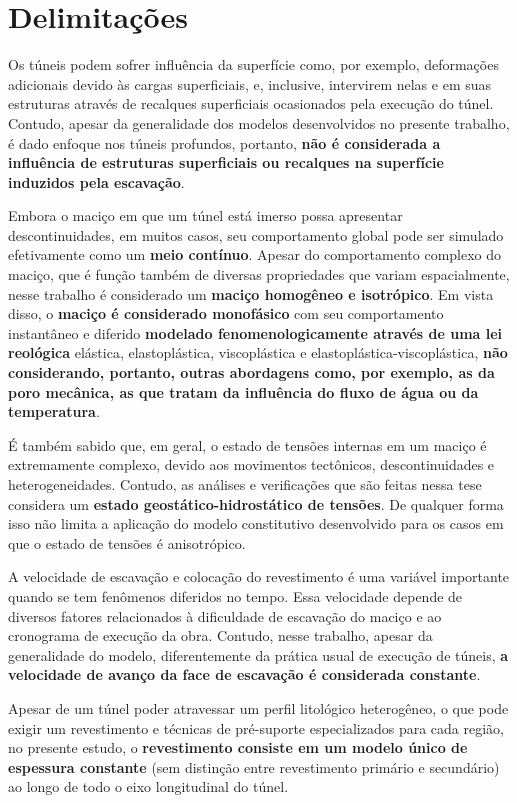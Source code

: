 \section{Delimitações}
Os túneis podem sofrer influência da superfície como, por exemplo, deformações adicionais devido às cargas superficiais, e, inclusive, intervirem nelas e em suas estruturas através de recalques superficiais ocasionados pela execução do túnel. Contudo, apesar da generalidade dos modelos desenvolvidos no presente trabalho, é dado enfoque nos túneis profundos, portanto, \textbf{não é considerada a influência de estruturas superficiais ou recalques na superfície induzidos pela escavação}.

Embora o maciço em que um túnel está imerso possa apresentar descontinuidades, em muitos casos, seu comportamento global pode ser simulado efetivamente como um \textbf{meio contínuo}. Apesar do comportamento complexo do maciço, que é função também de diversas propriedades que variam espacialmente, nesse trabalho é considerado um \textbf{maciço homogêneo e isotrópico}. Em vista disso, o \textbf{maciço é considerado monofásico} com seu comportamento instantâneo e diferido \textbf{modelado fenomenologicamente através de uma lei reológica} elástica, elastoplástica, viscoplástica e elastoplástica-viscoplástica, \textbf{não considerando, portanto, outras abordagens como, por exemplo, as da poro mecânica, as que tratam da influência do fluxo de água ou da temperatura}.

É também sabido que, em geral, o estado de tensões internas em um maciço é extremamente complexo, devido aos movimentos tectônicos, descontinuidades e heterogeneidades. Contudo, as análises e verificações que são feitas nessa tese considera um \textbf{estado geostático-hidrostático de tensões}. De qualquer forma isso não limita a aplicação do modelo constitutivo desenvolvido para os casos em que o estado de tensões é anisotrópico.

A velocidade de escavação e colocação do revestimento é uma variável importante quando se tem fenômenos diferidos no tempo. Essa velocidade depende de diversos fatores relacionados à dificuldade de escavação do maciço e ao cronograma de execução da obra. Contudo, nesse trabalho, apesar da generalidade do modelo, diferentemente da prática usual de execução de túneis, \textbf{a velocidade de avanço da face de escavação é considerada constante}.

Apesar de um túnel poder atravessar um perfil litológico heterogêneo, o que pode exigir um revestimento e técnicas de pré-suporte especializados para cada região, no presente estudo, o \textbf{revestimento consiste em um modelo único de espessura constante} (sem distinção entre revestimento primário e secundário) ao longo de todo o eixo longitudinal do túnel.

